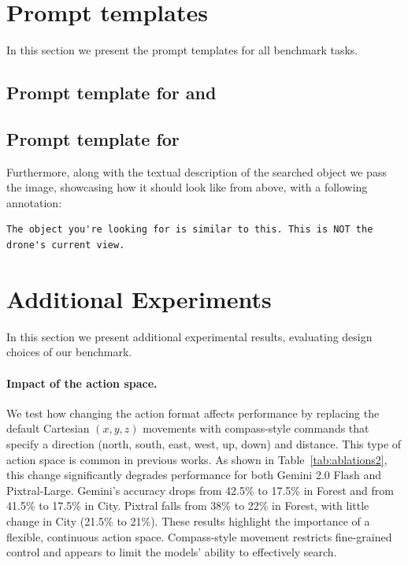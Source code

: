 \section{Prompt templates}

In this section we present the prompt templates for all benchmark tasks.

\label{sec:prompt}

\subsection{Prompt template for \challenge{} and \anomalychallenge{}}



\subsection{Prompt template for \hardchallenge{}}



Furthermore, along with the textual description of the searched object we pass the image, showcasing how it should look like from above, with a following annotation: 

\begin{lstlisting}[caption=Annotation of searched object's image in \hardchallenge{}.,label={lst:anno}]
The object you're looking for is similar to this. This is NOT the drone's current view.
\end{lstlisting}


\section{Additional Experiments}

In this section we present additional experimental results, evaluating design choices of our benchmark.

\label{app:additional_exps}




\paragraph{Impact of the action space.}
We test how changing the action format affects performance by replacing the default Cartesian $(x, y, z)$ movements with compass-style commands that specify a direction (north, south, east, west, up, down) and distance. This type of action space is common in previous works. As shown in Table~\ref{tab:ablations2}, this change significantly degrades performance for both Gemini 2.0 Flash and Pixtral-Large. Gemini’s accuracy drops from 42.5\% to 17.5\% in Forest and from 41.5\% to 17.5\% in City. Pixtral falls from 38\% to 22\% in Forest, with little change in City (21.5\% to 21\%).
These results highlight the importance of a flexible, continuous action space. Compass-style movement restricts fine-grained control and appears to limit the models’ ability to effectively search.

